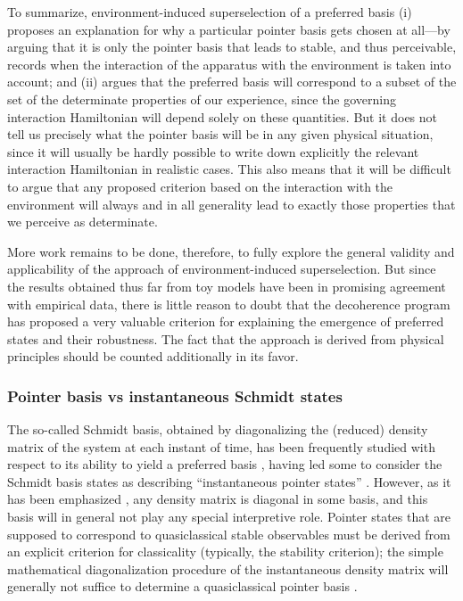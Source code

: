 \documentclass[rmp,aps,amsmath,amsfonts,noshowkeys,noshowpacs,12pt]{revtex4}
\begin{document}
To summarize, environment-induced superselection of a preferred basis
(i) proposes an explanation for why a particular pointer basis gets
chosen at all---by arguing that it is only the pointer basis that
leads to stable, and thus perceivable, records when the interaction of
the apparatus with the environment is taken into account; and (ii)
argues that the preferred basis will correspond to a subset of the set
of the determinate properties of our experience, since the governing
interaction Hamiltonian will depend solely on these quantities. But it
does not tell us precisely what the pointer basis will be in any given
physical situation, since it will usually be hardly possible to write
down explicitly the relevant interaction Hamiltonian in realistic
cases.  This also means that it will be difficult to argue that any
proposed criterion based on the interaction with the environment will
always and in all generality lead to exactly those properties that we
perceive as determinate.

More work remains to be done, therefore, to fully explore the general
validity and applicability of the approach of environment-induced
superselection. But since the results obtained thus far from toy
models have been in promising agreement with empirical data, there is
little reason to doubt that the decoherence program has proposed a
very valuable criterion for explaining the emergence of preferred states
and their robustness. The fact that the approach is derived from
physical principles should be counted additionally in its favor.


\subsubsection{Pointer basis vs instantaneous Schmidt states \label{sec:schmidt}}

The so-called Schmidt basis, obtained by diagonalizing the
(reduced) density matrix of the system at each instant of time, has been
frequently studied with respect to its ability to yield a preferred
basis \citep[see, for
example,][]{Zeh:1973:wq,Albrecht:1992:rz,Albrecht:1993:pq}, having led
some to consider the Schmidt basis states as describing
``instantaneous pointer states'' \citep{Albrecht:1992:rz}.  However,
as it has been emphasized \citep[for example, by][]{Zurek:1993:pu},
any density matrix is diagonal in some basis, and this basis will in
general not play any special interpretive role. Pointer states that
are supposed to correspond to quasiclassical stable observables must
be derived from an explicit criterion for classicality (typically, the
stability criterion); the simple mathematical diagonalization
procedure of the instantaneous density matrix will generally not
suffice to determine a quasiclassical pointer basis \citep[see the
studies by][]{Barvinsky:1995:pa,Kent:1997:oz}.
\end{document}
